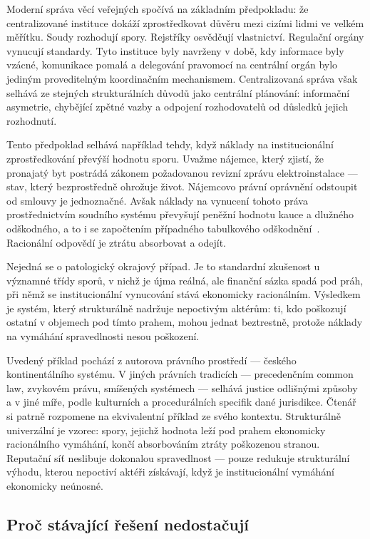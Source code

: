\documentclass[11pt,a4paper,twocolumn]{article}
\begin{document}
Moderní správa věcí veřejných spočívá na základním předpokladu: že centralizované instituce dokáží zprostředkovat důvěru mezi cizími lidmi ve velkém měřítku. Soudy rozhodují spory. Rejstříky osvědčují vlastnictví. Regulační orgány vynucují standardy. Tyto instituce byly navrženy v době, kdy informace byly vzácné, komunikace pomalá a delegování pravomocí na centrální orgán bylo jediným proveditelným koordinačním mechanismem. Centralizovaná správa však selhává ze stejných strukturálních důvodů jako centrální plánování: informační asymetrie, chybějící zpětné vazby a odpojení rozhodovatelů od důsledků jejich rozhodnutí.

Tento předpoklad selhává například tehdy, když náklady na institucionální zprostředkování převýší hodnotu sporu. Uvažme nájemce, který zjistí, že pronajatý byt postrádá zákonem požadovanou revizní zprávu elektroinstalace --- stav, který bezprostředně ohrožuje život. Nájemcovo právní oprávnění odstoupit od smlouvy je jednoznačné. Avšak náklady na vynucení tohoto práva prostřednictvím soudního systému převyšují peněžní hodnotu kauce a dlužného odškodného, a to i se započtením případného tabulkového odškodnění~\cite{czcourtfees}. Racionální odpovědí je ztrátu absorbovat a odejít.

Nejedná se o patologický okrajový případ. Je to standardní zkušenost u významné třídy sporů, v nichž je újma reálná, ale finanční sázka spadá pod práh, při němž se institucionální vynucování stává ekonomicky racionálním. Výsledkem je systém, který strukturálně nadržuje nepoctivým aktérům: ti, kdo poškozují ostatní v objemech pod tímto prahem, mohou jednat beztrestně, protože náklady na vymáhání spravedlnosti nesou poškození.

Uvedený příklad pochází z autorova právního prostředí --- českého kontinentálního systému. V jiných právních tradicích --- precedenčním common law, zvykovém právu, smíšených systémech --- selhává justice odlišnými způsoby a v jiné míře, podle kulturních a procedurálních specifik dané jurisdikce. Čtenář si patrně rozpomene na ekvivalentní příklad ze svého kontextu. Strukturálně univerzální je vzorec: spory, jejichž hodnota leží pod prahem ekonomicky racionálního vymáhání, končí absorbováním ztráty poškozenou stranou. Reputační síť neslibuje dokonalou spravedlnost --- pouze redukuje strukturální výhodu, kterou nepoctiví aktéři získávají, když je institucionální vymáhání ekonomicky neúnosné.

\subsection{Proč stávající řešení nedostačují}
\end{document}
